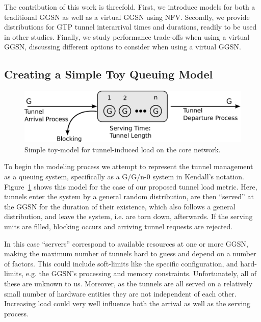 The contribution of this work is threefold. First, we introduce models for both a traditional \gls{GGSN} as well as a virtual \gls{GGSN} using \gls{NFV}. Secondly, we provide distributions for \gls{GTP} tunnel interarrival times and durations, readily to be used in other studies. Finally, we study performance trade-offs when using a virtual \gls{GGSN}, discussing different options to consider when using a virtual \gls{GGSN}.


\subsection{Creating a Simple Toy Queuing Model}

\begin{figure}[htb]
	\centering
	\includegraphics[width=\columnwidth]{images/GGn-model.pdf}
	\caption{Simple toy-model for tunnel-induced load on the core network.}
	\label{c4:fig:ggn-model}
\end{figure}

To begin the modeling process we attempt to represent the tunnel management as a queuing system, specifically as a G/G/n-0 system in Kendall's notation. Figure~\ref{c4:fig:ggn-model} shows this model for the case of our proposed tunnel load metric. Here, tunnels enter the system by a general random distribution, are then ``served'' at the \gls{GGSN} for the duration of their existence, which also follows a general distribution, and leave the system, i.e. are torn down, afterwards. If the serving units are filled, blocking occurs and arriving tunnel requests are rejected.

In this case ``servers'' correspond to available resources at one or more \gls{GGSN}, making the maximum number of tunnels hard to guess and depend on a number of factors. This could include soft-limits like the specific configuration, and hard-limits, e.g. the \gls{GGSN}'s processing and memory constraints. Unfortunately, all of these are unknown to us. Moreover, as the tunnels are all served on a relatively small number of hardware entities they are not independent of each other. Increasing load could very well influence both the arrival as well as the serving process.

